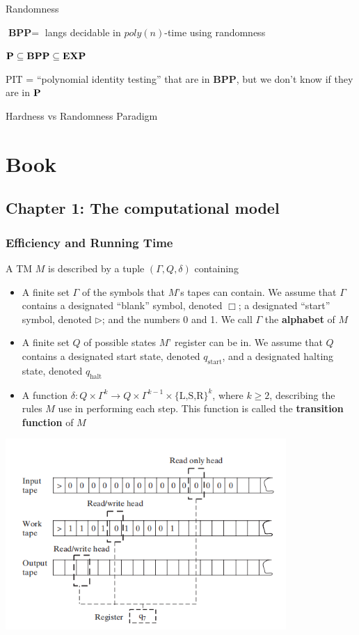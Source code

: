 \documentclass[11pt]{article}
\def \EXP {\textbf{EXP}}
\def \BPP {\textbf{BPP}}
\def \start {\text{start}}
\def \halt {\text{halt}}
\begin{document}
Randomness

\(\BPP=\) langs decidable in \(poly(n)\)-time using randomness

\(\bP\subseteq\BPP\subseteq\EXP\)

PIT = ``polynomial identity testing'' that are in \(\BPP\), but we don't know if they are in \(\operatorname{\textbf{P}}\)

Hardness vs Randomness Paradigm


\section{Book}
\label{sec:org52536db}
\subsection{Chapter 1: The computational model}
\label{sec:org1d1eaa0}

\subsubsection{Efficiency and Running Time}
\label{sec:org0ae7c9d}
\begin{definition}[]
A TM \(M\) is described by a tuple \((\Gamma,Q,\delta)\) containing
\begin{itemize}
\item A finite set \(\Gamma\) of the symbols that \(M\)'s tapes can contain. We assume that \(\Gamma\) contains a
designated ``blank'' symbol, denoted \(\Box\); a designated ``start'' symbol, denoted \(\rhd\);
and the numbers 0 and 1. We call \(\Gamma\) the \textbf{alphabet} of \(M\)
\item A finite set \(Q\) of possible states \(M\)' register can be in. We assume that \(Q\) contains
a designated start state, denoted \(q_{\start}\), and a designated halting state, denoted \(q_{\halt}\)
\item A function \(\delta:Q\times\Gamma^k\to Q\times\Gamma^{k-1}\times\{\text{L,S,R}\}^k\),
where \(k\ge2\), describing the rules \(M\) use in performing each step. This function is
called the \textbf{transition function} of \(M\)
\end{itemize}
\end{definition}

\begin{center}
\includegraphics[width=0.8\textwidth]{../images/ComputationalComplexity/1.png}
\end{center}
\end{document}
